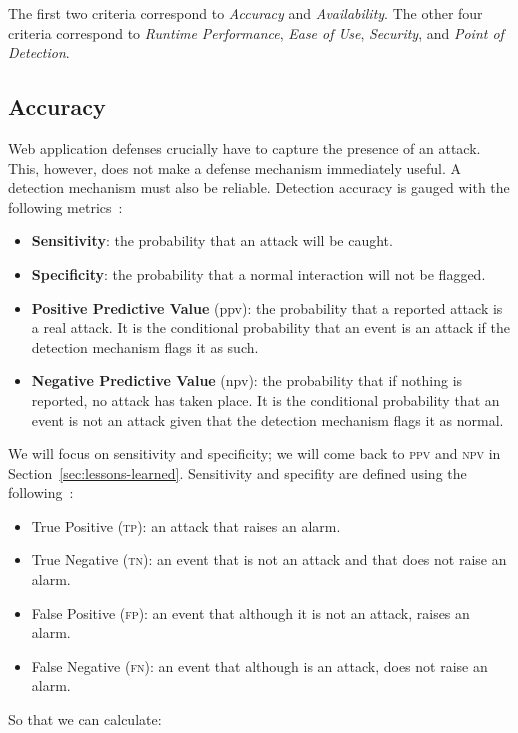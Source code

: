 \documentclass[10pt,journal,compsoc]{IEEEtran}
\begin{document}
The first two criteria correspond to \emph{Accuracy} and
\emph{Availability}. The other four criteria correspond to \emph{Runtime
  Performance}, \emph{Ease of Use}, \emph{Security}, and
\emph{Point of Detection}.

\subsection{Accuracy}
\label{ssec:diagnostic-performance}

Web application defenses 
crucially have to capture the presence of an attack. This, however, does not
make a defense mechanism immediately useful. A
detection mechanism must also be reliable.
Detection accuracy is gauged with the following
metrics~\cite{GFDLS06,A00}:
\vspace{-0.7mm}
\begin{itemize}
\item {\bf Sensitivity}: the probability that an attack will be
  caught.
\item {\bf Specificity}: the probability that a normal interaction
  will not be flagged.
\item {\bf Positive Predictive Value} ({\sc ppv}): the probability that a
  reported attack is a real attack. It is the conditional probability
  that an event is an attack if the detection mechanism flags it as
  such. 
\item {\bf Negative Predictive Value} ({\sc npv}): the probability that if
  nothing is reported, no attack has taken place. It is the conditional
  probability that an event is not an attack given that the detection
  mechanism flags it as normal.
\end{itemize}
\vspace{-0.7mm}
\noindent
We will focus on sensitivity and specificity; we will come back to
\textsc{ppv} and \textsc{npv} in Section~\ref{sec:lessons-learned}.
Sensitivity and specifity are defined using the following~\cite{linn2004}:
\vspace{-0.7mm}
\begin{itemize}
\item True Positive (\textsc{tp}): an attack that raises an alarm.
\item True Negative (\textsc{tn}): an event that is not an attack and that does
  not raise an alarm.
\item False Positive (\textsc{fp}): an event that although it is not an attack,
  raises an alarm.
\item False Negative (\textsc{fn}): an event that although is an attack, does
  not raise an alarm.
\end{itemize}
\vspace{-0.7mm}
\noindent
So that we can calculate:
\end{document}

